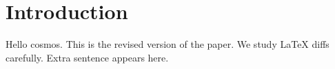 \section{Introduction}
Hello cosmos. This is the revised version of the paper.
We study LaTeX diffs carefully. Extra sentence appears here.
